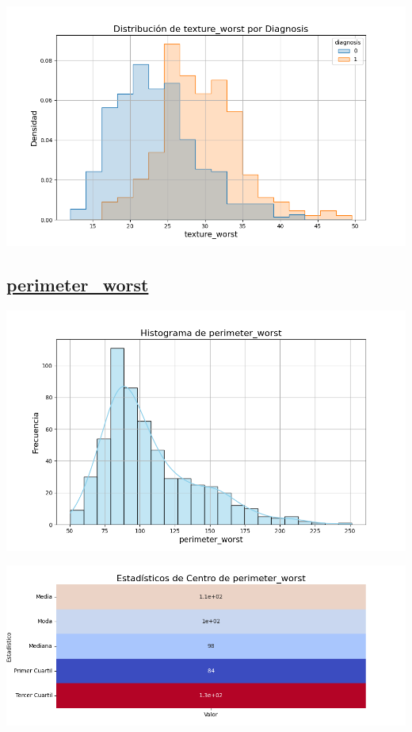 \documentclass[a4paper, 12pt]{article}
\begin{document}
\includegraphics[width=\textwidth]{../Plots/plots_diagnosis/distribucion_texture_worst_por_diagnosis.png}

\subsection*{\underline{perimeter\_worst}}

	\includegraphics[width=\textwidth]{../Plots/plots_stats/perimeter_worst/histograma_perimeter_worst.png}




\includegraphics[width=\textwidth]{../Plots/plots_stats/perimeter_worst/estadisticas_centro_perimeter_worst.png}
\end{document}
